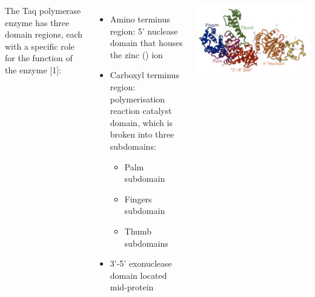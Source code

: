 \documentclass[14pt, a2paper, landscape]{tikzposter}
\begin{document}
\begin{columns}
    {
    The Taq polymerase enzyme has three domain regions, each with a specific role for the function of the enzyme [1]:
    
    	\begin{minipage}{.5\linewidth}
    	\begin{itemize}	
    	\item Amino terminus region: 5' nuclease domain that houses the zinc () ion
    	\item Carboxyl terminus region: polymerisation reaction catalyst domain, which is broken into three subdomains:
    	\begin{itemize}
    	\item Palm subdomain
    	\item Fingers subdomain
    	\item Thumb subdomains
    	\end{itemize}
    	\item 3'-5' exonuclease domain located mid-protein
    	\end{itemize}
    	\end{minipage}
    	\hfill
		\begin{minipage}{.5\linewidth}
			\centering
			\includegraphics[width=\linewidth]{Screenshot1}
		\end{minipage}
	}
    

\end{columns}
\end{document}
